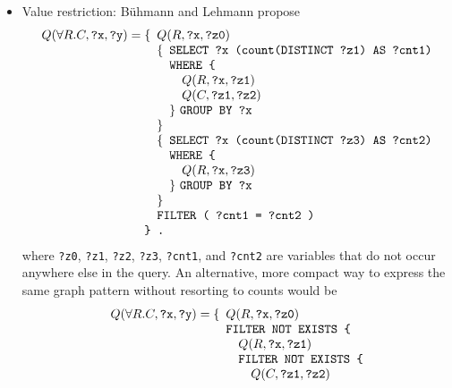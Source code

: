 \documentclass[a4paper]{article}
\newcounter{ex}
\begin{document}
\begin{itemize}
\item Value restriction: 
  B\"uhmann and Lehmann propose
  \begin{equation}
    Q(\forall R.C, \mbox{\tt ?x}, \mbox{\tt ?y}) =
    \begin{minipage}[t]{5in}
      \begin{tabbing}
        \quad\=\quad\=\quad\=\kill
        \{\>$Q(R, \mbox{\tt ?x}, \mbox{\tt ?z0})$\\
        \>\{\>\texttt{SELECT ?x (count(DISTINCT ?z1) AS ?cnt1)}\\
        \>\>\texttt{WHERE \{}\\
        \>\>\>$Q(R, \mbox{\tt ?x}, \mbox{\tt ?z1})$\\
        \>\>\>$Q(C, \mbox{\tt ?z1}, \mbox{\tt ?z2})$\\
        \>\>\} \texttt{GROUP BY ?x}\\
        \>\}\\
        \>\{\>\texttt{SELECT ?x (count(DISTINCT ?z3) AS ?cnt2)}\\
        \>\>\texttt{WHERE \{}\\
        \>\>\>$Q(R, \mbox{\tt ?x}, \mbox{\tt ?z3})$\\
        \>\>\} \texttt{GROUP BY ?x}\\
        \>\}\\
        \>\texttt{FILTER ( ?cnt1 = ?cnt2 )}\\
        \texttt{\} .}
      \end{tabbing}
    \end{minipage}
  \end{equation}
  where \texttt{?z0}, \texttt{?z1}, \texttt{?z2}, \texttt{?z3}, \texttt{?cnt1}, and \texttt{?cnt2}
  are variables that do not occur anywhere else in the query.
  An alternative, more compact way to express the same graph pattern without resorting to counts
  would be
  \begin{equation}
    Q(\forall R.C, \mbox{\tt ?x}, \mbox{\tt ?y}) =
    \begin{minipage}[t]{5in}
      \begin{tabbing}
        \quad\=\quad\=\quad\=\kill
        \{\>$Q(R, \mbox{\tt ?x}, \mbox{\tt ?z0})$\\
        \>\texttt{FILTER NOT EXISTS \{}\\
        \>\>$Q(R, \mbox{\tt ?x}, \mbox{\tt ?z1})$\\
        \>\>\texttt{FILTER NOT EXISTS \{}\\
        \>\>\>$Q(C, \mbox{\tt ?z1}, \mbox{\tt ?z2})$\\

\end{tabbing}
\end{minipage}
\end{equation}
\end{itemize}
\end{document}
